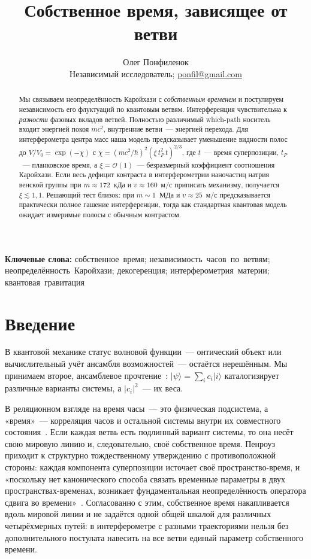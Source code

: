 \documentclass[12pt,a4paper]{article}
\title{\textbf{Собственное время, зависящее от ветви}}
\author{%
  Олег Понфиленок\\[0.35em]%
  {\normalsize Независимый исследователь; \href{mailto:ponfil@gmail.com}{ponfil@gmail.com}}%
}
\date{}
\begin{document}
\pagecolor{black}
\color{white}
\pagestyle{plain}

\maketitle

\begin{abstract}
Мы связываем неопределённость Каройхази с \emph{собственным временем} и постулируем независимость его флуктуаций по квантовым ветвям. Интерференция чувствительна к \emph{разности} фазовых вкладов ветвей. Полностью различимый which-path носитель входит энергией покоя $mc^2$, внутренние ветви~--- энергией перехода. Для интерферометра центра масс наша модель предсказывает уменьшение видности полос до $V/V_0=\exp(-\chi)$ с $\chi=(mc^2/\hbar)^2(\xi\,t_P^2\,t)^{2/3}$, где $t$~--- время суперпозиции, $t_P$~--- планковское время, а $\xi=\mathcal O(1)$~--- безразмерный коэффициент соотношения Каройхази. Если весь дефицит контраста в интерферометрии наночастиц натрия венской группы при $m\approx172$~кДа и $v\approx160$~м/с приписать механизму, получается $\xi\lesssim1{,}1$. Решающий тест близок: при $m\sim 1$~МДа и $v\approx25$~м/с предсказывается практически полное гашение интерференции, тогда как стандартная квантовая модель ожидает измеримые полосы с обычным контрастом.
\end{abstract}

\noindent\textbf{Ключевые слова:} собственное~время; независимость~часов~по~ветвям; неопределённость~Каройхази; декогеренция; интерферометрия~материи; квантовая~гравитация

\section{Введение}
\label{sec:intro}

В квантовой механике статус волновой функции~--- онтический объект или вычислительный учёт ансамбля возможностей~--- остаётся нерешённым. Мы принимаем второе, ансамблевое прочтение~\cite{ballentine1970,home1992}: $\lvert\psi\rangle=\sum_i c_i\lvert i\rangle$ каталогизирует различные варианты системы, а $|c_i|^2$~--- их веса.

В реляционном взгляде на время часы~--- это физическая подсистема, а «время»~--- корреляция часов и остальной системы внутри их совместного состояния~\cite{pagewootters}. Если каждая ветвь есть подлинный вариант системы, то она несёт свою мировую линию и, следовательно, своё собственное время. Пенроуз приходит к структурно тождественному утверждению с противоположной стороны: каждая компонента суперпозиции источает своё пространство-время, и «поскольку нет канонического способа связать временные параметры в двух пространствах-временах, возникает фундаментальная неопределённость оператора сдвига во времени»~\cite{penrose1996}. Согласованно с этим, собственное время накапливается вдоль мировой линии и не задаётся одной общей шкалой для различных четырёхмерных путей: в интерферометре с разными траекториями нельзя без дополнительного постулата навесить на все ветви единый параметр собственного времени.
\end{document}
